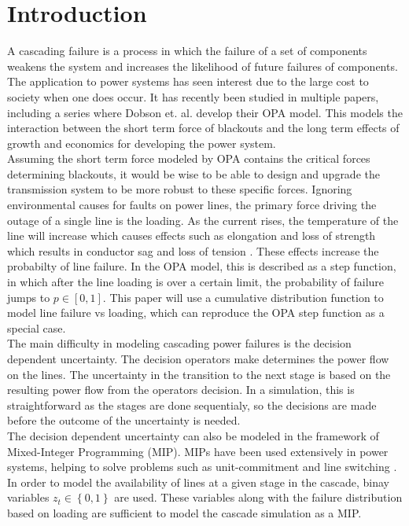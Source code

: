 \section{Introduction}
A cascading failure is a process in which the failure of a set of components weakens the system and increases the likelihood of future failures of components.  The application to power systems has seen interest due to the large cost to society when one does occur.  It has recently been studied in multiple papers, including a series where Dobson et. al. develop their OPA model.  This models the interaction between the short term force of blackouts and the long term effects of growth and economics for developing the power system.  \\

Assuming the short term force modeled by OPA contains the critical forces determining blackouts, it would be wise to be able to design and upgrade the transmission system to be more robust to these specific forces.  Ignoring environmental causes for faults on power lines, the primary force driving the outage of a single line is the loading.  As the current rises, the temperature of the line will increase which causes effects such as elongation and loss of strength which results in conductor sag and loss of tension \cite{high_temp_std}.  These effects increase the probabilty of line failure.  In the OPA model, this is described as a step function, in which after the line loading is over a certain limit, the probability of failure jumps to $p \in [0, 1]$.  This paper will use a cumulative distribution function to model line failure vs loading, which can reproduce the OPA step function as a special case. \\

The main difficulty in modeling cascading power failures is the decision dependent uncertainty.  The decision operators make determines the power flow on the lines.  The uncertainty in the transition to the next stage is based on the resulting power flow from the operators decision.  In a simulation, this is straightforward as the stages are done sequentialy, so the decisions are made before the outcome of the uncertainty is needed.	\\

The decision dependent uncertainty can also be modeled in the framework of Mixed-Integer Programming (MIP).  MIPs have been used extensively in power systems, helping to solve problems such as unit-commitment \cite{unit_commit} and line switching \cite{line_switch}.  In order to model the availability of lines at a given stage in the cascade, binay variables $ z_t \in \left\{0, 1\right\} $ are used.  These variables along with the failure distribution based on loading are sufficient to model the cascade simulation as a MIP.  \\

